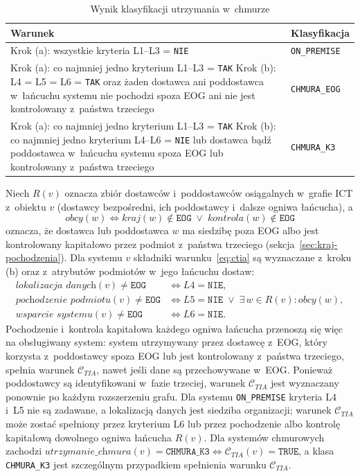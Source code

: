 \begin{table}[ht]
\centering
\caption{Wynik klasyfikacji utrzymania w~chmurze}
\label{tab:wynik-chmura}
\begin{tabular}{p{10cm} p{4cm}}
\toprule
Warunek & Klasyfikacja \\
\midrule
Krok (a): wszystkie kryteria L1--L3 = \texttt{NIE}  & \texttt{ON\_PREMISE}   \\
\midrule
Krok (a): co najmniej jedno kryterium L1--L3 = \texttt{TAK} \newline
Krok (b): L4 = L5 = L6 = \texttt{TAK} \newline
oraz żaden dostawca ani poddostawca w~łańcuchu systemu nie pochodzi spoza EOG ani nie jest kontrolowany z~państwa trzeciego & \texttt{CHMURA\_EOG}    \\
\midrule
Krok (a): co najmniej jedno kryterium L1--L3 = \texttt{TAK} \newline
Krok (b): co najmniej jedno kryterium L4--L6 = \texttt{NIE} \newline
lub dostawca bądź poddostawca w~łańcuchu systemu spoza EOG lub kontrolowany z~państwa trzeciego & \texttt{CHMURA\_K3}    \\
\bottomrule
\end{tabular}
\end{table}

\noindent Niech $R(v)$ oznacza zbiór dostawców i~poddostawców osiągalnych w~grafie ICT z~obiektu $v$ (dostawcy bezpośredni, ich poddostawcy i~dalsze ogniwa łańcucha), a
\[
\textit{obcy}(w) \iff \textit{kraj}(w) \notin \texttt{EOG} \;\vee\; \textit{kontrola}(w) \notin \texttt{EOG}
\]
oznacza, że dostawca lub poddostawca $w$ ma siedzibę poza EOG albo jest kontrolowany kapitałowo przez podmiot z~państwa trzeciego (sekcja~\ref{sec:kraj-pochodzenia}). Dla systemu $v$ składniki warunku~\eqref{eq:ctia} są wyznaczane z~kroku (b) oraz z~atrybutów podmiotów w~jego łańcuchu dostaw:
\begin{align*}
\textit{lokalizacja danych}(v) \neq \texttt{EOG} &\iff L4 = \texttt{NIE}, \\
\textit{pochodzenie podmiotu}(v) \neq \texttt{EOG} &\iff L5 = \texttt{NIE}
  \;\vee\; \exists\, w \in R(v) : \textit{obcy}(w), \\
\textit{wsparcie systemu}(v) \neq \texttt{EOG} &\iff L6 = \texttt{NIE}.
\end{align*}
Pochodzenie i~kontrola kapitałowa każdego ogniwa łańcucha przenoszą się więc na obsługiwany system: system utrzymywany przez dostawcę z~EOG, który korzysta z~poddostawcy spoza EOG lub jest kontrolowany z~państwa trzeciego, spełnia warunek $\mathcal{C}_{TIA}$, nawet jeśli dane są przechowywane w~EOG. Ponieważ poddostawcy są identyfikowani w~fazie trzeciej, warunek $\mathcal{C}_{TIA}$ jest wyznaczany ponownie po każdym rozszerzeniu grafu. Dla systemu \texttt{ON\_PREMISE} kryteria L4 i~L5 nie są zadawane, a lokalizacją danych jest siedziba organizacji; warunek $\mathcal{C}_{TIA}$ może zostać spełniony przez kryterium L6 lub przez pochodzenie albo kontrolę kapitałową dowolnego ogniwa łańcucha $R(v)$. Dla systemów chmurowych zachodzi $\textit{utrzymanie\_chmura}(v) = \texttt{CHMURA\_K3} \iff \mathcal{C}_{TIA}(v) = \texttt{TRUE}$, a klasa \texttt{CHMURA\_K3} jest szczególnym przypadkiem spełnienia warunku $\mathcal{C}_{TIA}$.

